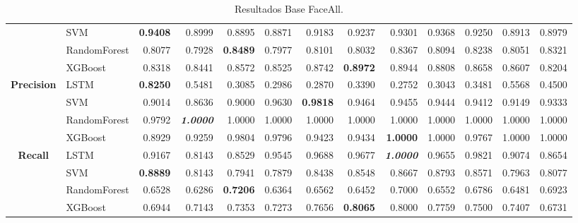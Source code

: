 \begin{table}[H]
\begin{adjustbox}{max width=12cm}
\begin{tabular}{|c|l|r|r|r|r|r|r|r|r|r|r|r|}
			& SVM &  \textbf{0.9408} &  0.8999 &  0.8895 &  0.8871 &  0.9183 &  0.9237 &  0.9301 &  0.9368 &  0.9250 &  0.8913 &  0.8979 \\
			& RandomForest &  0.8077 &  0.7928 &  \textbf{0.8489} &  0.7977 &  0.8101 &  0.8032 &  0.8367 &  0.8094 &  0.8238 &  0.8051 &  0.8321 \\
			& XGBoost &  0.8318 &  0.8441 &  0.8572 &  0.8525 &  0.8742 &  \textbf{0.8972} &  0.8944 &  0.8808 &  0.8658 &  0.8607 &  0.8204 \\
			\hline
			\textbf{Precision} & LSTM &  \textbf{0.8250} &  0.5481 &  0.3085 &  0.2986 &  0.2870 &  0.3390 &  0.2752 &  0.3043 &  0.3481 &  0.5568 &  0.4500 \\
			& SVM &  0.9014 &  0.8636 &  0.9000 &  0.9630 &  \textbf{0.9818} &  0.9464 &  0.9455 &  0.9444 &  0.9412 &  0.9149 &  0.9333 \\
			& RandomForest &  0.9792 &  \textit{\textbf{1.0000}} &  1.0000 &  1.0000 &  1.0000 &  1.0000 &  1.0000 &  1.0000 &  1.0000 &  1.0000 &  1.0000 \\
			& XGBoost &  0.8929 &  0.9259 &  0.9804 &  0.9796 &  0.9423 &  0.9434 &  \textbf{1.0000} &  1.0000 &  0.9767 &  1.0000 &  1.0000 \\
			\hline
			\textbf{Recall} & LSTM &  0.9167 &  0.8143 &  0.8529 &  0.9545 &  0.9688 &  0.9677 &  \textit{\textbf{1.0000}} &  0.9655 &  0.9821 &  0.9074 &  0.8654 \\
			& SVM &  \textbf{0.8889} &  0.8143 &  0.7941 &  0.7879 &  0.8438 &  0.8548 &  0.8667 &  0.8793 &  0.8571 &  0.7963 &  0.8077 \\
			& RandomForest &  0.6528 &  0.6286 &  \textbf{0.7206} &  0.6364 &  0.6562 &  0.6452 &  0.7000 &  0.6552 &  0.6786 &  0.6481 &  0.6923 \\
			& XGBoost &  0.6944 &  0.7143 &  0.7353 &  0.7273 &  0.7656 &  \textbf{0.8065} &  0.8000 &  0.7759 &  0.7500 &  0.7407 &  0.6731 \\
			\hline
		\end{tabular}
	\end{adjustbox}
	\caption{Resultados Base FaceAll.}
	\label{tab:faceAllBase}
\end{table}

